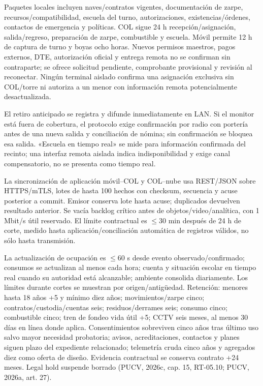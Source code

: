 \documentclass[11pt,letterpaper]{report}
\begin{document}
Paquetes locales incluyen naves/contratos vigentes, documentación de zarpe, recursos/compatibilidad, escuela del turno, autorizaciones, existencias/órdenes, contactos de emergencia y políticas. COL sigue 24 h recepción/asignación, salida/regreso, preparación de zarpe, combustible y escuela. Móvil permite 12 h de captura de turno y boyas ocho horas. Nuevos permisos maestros, pagos externos, DTE, autorización oficial y entrega remota no se confirman sin contraparte; se ofrece solicitud pendiente, comprobante provisional y revisión al reconectar. Ningún terminal aislado confirma una asignación exclusiva sin COL/torre ni autoriza a un menor con información remota potencialmente desactualizada.

El retiro anticipado se registra y difunde inmediatamente en LAN. Si el monitor está fuera de cobertura, el protocolo exige confirmación por radio con portería antes de una nueva salida y conciliación de nómina; sin confirmación se bloquea esa salida. «Escuela en tiempo real» se mide para información confirmada del recinto; una interfaz remota aislada indica indisponibilidad y exige canal compensatorio, no se presenta como tiempo real.

La sincronización de aplicación móvil--COL y COL--nube usa REST/JSON sobre HTTPS/mTLS, lotes de hasta 100 hechos con checksum, secuencia y acuse posterior a commit. Emisor conserva lote hasta acuse; duplicados devuelven resultado anterior. Se vacía backlog crítico antes de objetos/video/analítica, con 1 Mbit/s útil reservado. El límite contractual es $\leq$30 min después de 24 h de corte, medido hasta aplicación/conciliación automática de registros válidos, no sólo hasta transmisión.

La actualización de ocupación es $\leq$60 s desde evento observado/confirmado; consumos se actualizan al menos cada hora; cuenta y situación escolar en tiempo real cuando su autoridad está alcanzable; ambiente consolida diariamente. Los límites durante cortes se muestran por origen/antigüedad. Retención: menores hasta 18 años +5 y mínimo diez años; movimientos/zarpe cinco; contratos/custodia/cuentas seis; residuos/derrames seis; consumo cinco; combustible cinco; tren de fondeo vida útil +5; CCTV seis meses, al menos 30 días en línea donde aplica. Consentimientos sobreviven cinco años tras último uso salvo mayor necesidad probatoria; avisos, acreditaciones, contactos y planes siguen plazo del expediente relacionado; telemetría cruda cinco años y agregados diez como oferta de diseño. Evidencia contractual se conserva contrato +24 meses. Legal hold suspende borrado (PUCV, 2026c, cap. 15, RT-05.10; PUCV, 2026a, art. 27).
\end{document}
